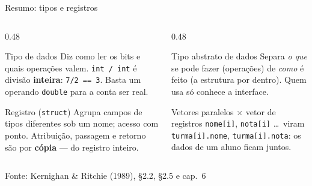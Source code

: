 \documentclass[aspectratio=169]{beamer}
\newcommand{\fonte}[1]{\vfill\hfill{\scriptsize\textcolor{UFSGray}{Fonte: #1}}}
\begin{document}
\begin{frame}{Resumo: tipos e registros}
  \begin{columns}[T]
    \begin{column}{0.48\textwidth}
      \begin{block}{Tipo de dados}
        \small Diz como ler os bits e quais operações valem.
        \texttt{int / int} é divisão \textbf{inteira}: \texttt{7/2 == 3}.
        Basta um operando \texttt{double} para a conta ser real.
      \end{block}
      \begin{block}{Registro (\texttt{struct})}
        \small Agrupa campos de tipos diferentes sob um nome; acesso com
        ponto. Atribuição, passagem e retorno são
        por \textbf{cópia} --- do registro inteiro.
      \end{block}
    \end{column}
    \begin{column}{0.48\textwidth}
      \begin{block}{Tipo abstrato de dados}
        \small Separa \emph{o que} se pode fazer (operações) de \emph{como}
        é feito (a estrutura por dentro). Quem usa só conhece a interface.
      \end{block}
      \begin{exampleblock}{Vetores paralelos $\times$ vetor de registros}
        \small \texttt{nome[i]}, \texttt{nota[i]} \ldots\ viram
        \texttt{turma[i].nome}, \texttt{turma[i].nota}: os dados de um aluno
        ficam juntos.
      \end{exampleblock}
    \end{column}
  \end{columns}
  \fonte{Kernighan \& Ritchie (1989), §2.2, §2.5 e cap.~6~\cite{kernighan1989c}}
\end{frame}
\end{document}
